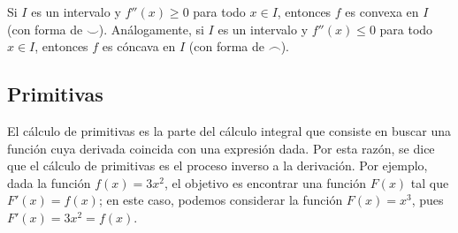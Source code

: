 \begin{teorema}
Si $I$ es un intervalo y $f''(x)\ge 0$ para todo $x\in I$, entonces $f$ es convexa en $I$ (con forma de $\smile$).
Análogamente, si $I$ es un intervalo y $f''(x)\le 0$ para todo $x\in I$, entonces $f$ es cóncava en $I$ (con forma de $\frown$).
\end{teorema}

\subsection{Primitivas}

El cálculo de primitivas es la parte del cálculo integral que consiste en buscar una función cuya derivada coincida con una expresión dada.
Por esta razón, se dice que el cálculo de primitivas es el proceso inverso a la derivación.
Por ejemplo, dada la función $f(x)=3x^2$, el objetivo es encontrar una función $F(x)$ tal que $F'(x)=f(x)$;  en este caso, podemos considerar la función $F(x)=x^3$, pues $F'(x)=3x^2=f(x)$.

